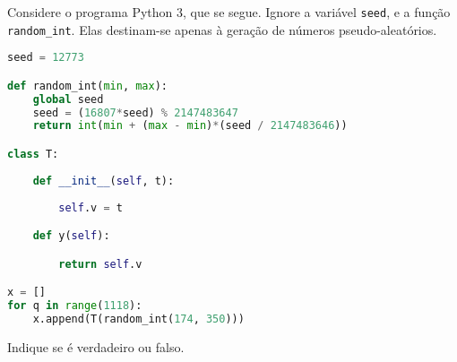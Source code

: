 \documentclass[12pt,varwidth=16cm,border=17pt]{standalone}
\begin{document}
Considere o programa Python 3, que se segue. Ignore a variável \verb+seed+, e a função \verb+random_int+. 
Elas destinam-se apenas à geração de números pseudo-aleatórios.

\begin{lstlisting}[language=Python]
seed = 12773

def random_int(min, max):
    global seed
    seed = (16807*seed) % 2147483647
    return int(min + (max - min)*(seed / 2147483646))

class T:
    
    def __init__(self, t):
        
        self.v = t

    def y(self):

        return self.v

x = []
for q in range(1118):
    x.append(T(random_int(174, 350)))
\end{lstlisting}

Indique se é verdadeiro ou falso.
\end{document}

